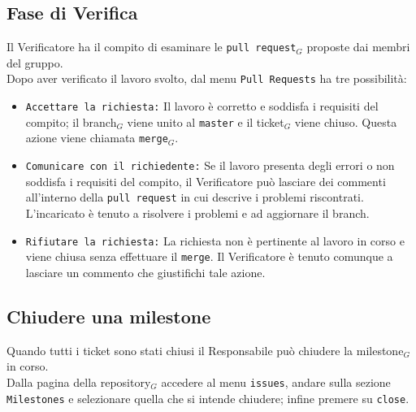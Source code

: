 \subsection{Fase di Verifica}
Il Verificatore ha il compito di esaminare le \texttt{pull request}$_{G}$ proposte dai membri del gruppo.\\
Dopo aver verificato il lavoro svolto, dal menu \texttt{Pull Requests} ha tre possibilità:
\begin{itemize}
\item \texttt{Accettare la richiesta:} Il lavoro è corretto e soddisfa i requisiti del compito; il branch$_{G}$ viene unito al \texttt{master} e il ticket$_{G}$ viene chiuso. Questa azione viene chiamata \texttt{merge}$_{G}$.
\item \texttt{Comunicare con il richiedente:} Se il lavoro presenta degli errori o non soddisfa i requisiti del compito, il Verificatore può lasciare dei commenti all'interno della \texttt{pull request} in cui descrive i problemi riscontrati. L'incaricato è tenuto a risolvere i problemi e ad aggiornare il branch.
\item \texttt{Rifiutare la richiesta:} La richiesta non è pertinente al lavoro in corso e viene chiusa senza effettuare il \texttt{merge}. Il Verificatore è tenuto comunque a lasciare un commento che giustifichi tale azione.
\end{itemize}

\subsection{Chiudere una milestone}
Quando tutti i ticket sono stati chiusi il Responsabile può chiudere la milestone$_{G}$ in corso. \\
Dalla pagina della repository$_{G}$ accedere al menu \texttt{issues}, andare sulla sezione \texttt{Milestones} e selezionare quella che si intende chiudere; infine premere su \texttt{close}.